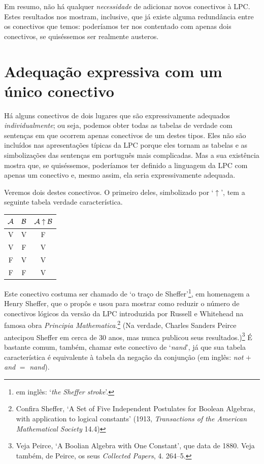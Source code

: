 Em resumo, não há qualquer \emph{necessidade} de adicionar novos conectivos à LPC.
Estes resultados nos mostram, inclusive, que já existe alguma redundância entre os conectivos que temos: poderíamos ter nos contentado com apenas dois conectivos, se quiséssemos ser realmente austeros.


\section{Adequação expressiva com um único conectivo}

Há alguns conectivos de dois lugares que são expressivamente adequados \emph{individualmente}; ou seja, podemos obter todas as tabelas de verdade com sentenças em que ocorrem apenas conectivos de um destes tipos.
Eles não são incluídos nas apresentações típicas da LPC porque eles tornam as tabelas e as simbolizações das sentenças em português mais complicadas.
Mas a sua existência mostra que, se quiséssemos, poderíamos ter definido a linguagem da LPC com apenas um conectivo e, mesmo assim, ela seria expressivamente adequada.

Veremos dois destes conectivos.
O primeiro deles, simbolizado por `$\uparrow$', tem a seguinte tabela verdade característica. 
\begin{center}
\begin{tabular}{c c | c}
$\mathcal{A}$ & $\mathcal{B}$ & $\mathcal{A} \mathrel{\uparrow} \mathcal{B}$\\
\hline
 V & V & F \\
 V & F & V \\
 F & V & V  \\
 F & F & V
\end{tabular}
\end{center}

 Este conectivo costuma ser chamado de `o traço de Sheffer'\footnote{ em inglês: `\emph{the Sheffer stroke}'.}, em homenagem a Henry Sheffer, que o propôs e usou para mostrar como reduzir o número de conectivos lógicos da versão da LPC introduzida por Russell e Whitehead na famosa obra  \emph{Principia Mathematica}.\footnote{
 Confira Sheffer, `A Set of Five Independent Postulates for Boolean Algebras, with application to logical constants' (1913, \emph{Transactions of the American Mathematical Society} 14.4)}
 (Na verdade, Charles Sanders Peirce antecipou Sheffer em cerca de 30 anos, mas nunca publicou seus resultados.)\footnote{
 Veja Peirce, `A Boolian Algebra with One Constant', que data de 1880. Veja também, de Peirce, os seus  \emph{Collected Papers}, 4. 264--5.}
 É bastante comum, também, chamar este conectivo de `\emph{nand}', já que sua tabela característica é equivalente à tabela da negação da conjunção (em inglês: \emph{not} $+$ \emph{and} $=$ \emph{nand}).



